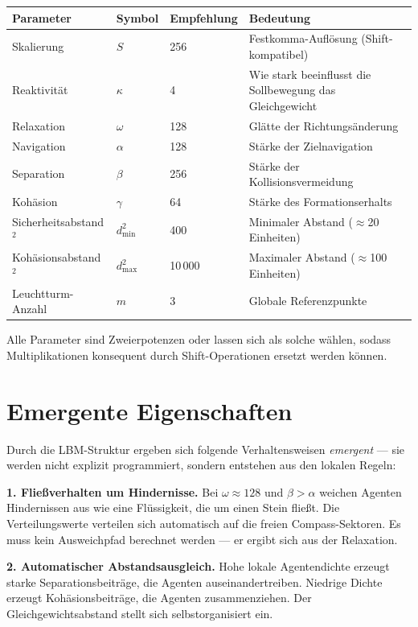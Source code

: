 \documentclass[11pt,a4paper]{article}
\begin{document}
\begin{center}
\begin{tabular}{@{}lllp{5.5cm}@{}}
\toprule
\textbf{Parameter} & \textbf{Symbol} & \textbf{Empfehlung} & \textbf{Bedeutung} \\
\midrule
Skalierung & $S$ & 256 & Festkomma-Aufl\"osung (Shift-kompatibel) \\
Reaktivit\"at & $\kappa$ & 4 & Wie stark beeinflusst die Sollbewegung das Gleichgewicht \\
Relaxation & $\omega$ & 128 & Gl\"atte der Richtungs\"anderung \\
Navigation & $\alpha$ & 128 & St\"arke der Zielnavigation \\
Separation & $\beta$ & 256 & St\"arke der Kollisionsvermeidung \\
Koh\"asion & $\gamma$ & 64 & St\"arke des Formationserhalts \\
Sicherheitsabstand$^2$ & $d^2_{\min}$ & 400 & Minimaler Abstand ($\approx$20 Einheiten) \\
Koh\"asionsabstand$^2$ & $d^2_{\max}$ & 10\,000 & Maximaler Abstand ($\approx$100 Einheiten) \\
Leuchtturm-Anzahl & $m$ & 3 & Globale Referenzpunkte \\
\bottomrule
\end{tabular}
\end{center}

Alle Parameter sind Zweierpotenzen oder lassen sich als solche w\"ahlen,
sodass Multiplikationen konsequent durch Shift-Operationen ersetzt werden k\"onnen.

\section{Emergente Eigenschaften}

Durch die LBM-Struktur ergeben sich folgende Verhaltensweisen \textit{emergent}
--- sie werden nicht explizit programmiert, sondern entstehen aus den lokalen Regeln:

\textbf{1. Flie\ss verhalten um Hindernisse.}
Bei $\omega \approx 128$ und $\beta > \alpha$ weichen Agenten
Hindernissen aus wie eine Fl\"ussigkeit, die um einen Stein flie\ss t.
Die Verteilungswerte verteilen sich automatisch auf die freien Compass-Sektoren.
Es muss kein Ausweichpfad berechnet werden --- er ergibt sich aus der Relaxation.

\textbf{2. Automatischer Abstandsausgleich.}
Hohe lokale Agentendichte erzeugt starke Separationsbeitr\"age,
die Agenten auseinandertreiben.
Niedrige Dichte erzeugt Koh\"asionsbeitr\"age, die Agenten zusammenziehen.
Der Gleichgewichtsabstand stellt sich selbstorganisiert ein.
\end{document}
